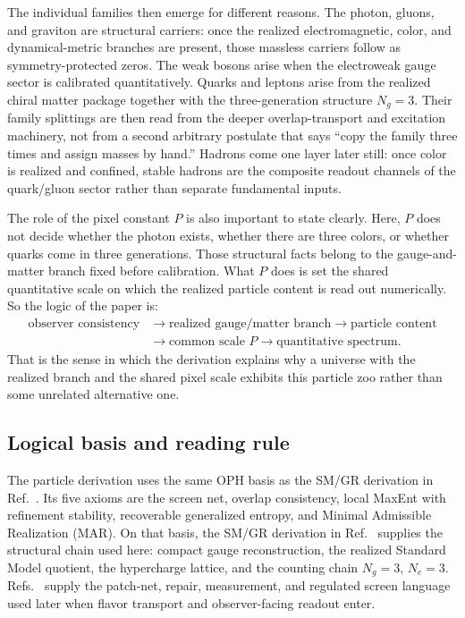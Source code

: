 \documentclass[11pt]{article}
\begin{document}
The individual families then emerge for different reasons. The photon, gluons, and graviton are
structural carriers: once the realized electromagnetic, color, and dynamical-metric branches are
present, those massless carriers follow as symmetry-protected zeros. The weak bosons arise when
the electroweak gauge sector is calibrated quantitatively. Quarks and leptons arise from the
realized chiral matter package together with the three-generation structure \(N_g=3\). Their
family splittings are then read from the deeper overlap-transport and excitation machinery, not
from a second arbitrary postulate that says ``copy the family three times and assign masses by
hand.'' Hadrons come one layer later still: once color is realized and confined, stable hadrons
are the composite readout channels of the quark/gluon sector rather than separate fundamental
inputs.

The role of the pixel constant \(P\) is also important to state clearly. Here, \(P\) does not
decide whether the photon exists, whether there are three colors, or whether quarks come in three
generations. Those structural facts belong to the gauge-and-matter branch fixed before
calibration. What \(P\) does is set the shared quantitative scale on which the realized particle
content is read out numerically. So the logic of the paper is:
\[
\begin{aligned}
\text{observer consistency}
&\to
\text{realized gauge/matter branch}
\to
\text{particle content} \\
&\to
\text{common scale }P
\to
\text{quantitative spectrum}.
\end{aligned}
\]
That is the sense in which the derivation explains why a universe with the realized branch and the
shared pixel scale exhibits this particle zoo rather than some unrelated alternative one.

\subsection{Logical basis and reading rule}

The particle derivation uses the same OPH basis as the SM/GR derivation in Ref.~\cite{ophcompact}. Its five
axioms are the screen net, overlap consistency, local MaxEnt with refinement stability,
recoverable generalized entropy, and Minimal Admissible Realization (MAR). On that basis, the
SM/GR derivation in Ref.~\cite{ophcompact} supplies the structural chain used here: compact gauge reconstruction, the realized
Standard Model quotient, the hypercharge lattice, and the counting chain \(N_g=3\), \(N_c=3\).
Refs.~\cite{ophconsensus,ophmicrophysics} supply the patch-net, repair, measurement, and
regulated screen language used later when flavor transport and observer-facing readout enter.
\end{document}
